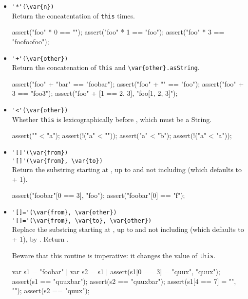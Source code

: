 \begin{itemize}
\item \lstinline|'*'(\var{n})|\\
  Return the concatentation of \lstinline|this|  times.
\begin{urbiscript}[firstnumber=last]
assert("foo" * 0 == "");
assert("foo" * 1 == "foo");
assert("foo" * 3 == "foofoofoo");
\end{urbiscript}

\item \lstinline|'+'(\var{other})|\\
  Return the concatenation of \lstinline|this| and
  \lstinline|\var{other}.asString|.
\begin{urbiscript}[firstnumber=last]
assert("foo" + "bar" == "foobar");
assert("foo" + "" == "foo");
assert("foo" + 3 == "foo3");
assert("foo" + [1 == 2, 3], "foo[1, 2, 3]");
\end{urbiscript}

\item \lstinline|'<'(\var{other})|\\
  Whether \lstinline|this| is lexicographically before ,
  which must be a String.
\begin{urbiscript}[firstnumber=last]
assert("" < "a");
assert(!("a" < ""));
assert("a" < "b");
assert(!("a" < "a"));
\end{urbiscript}

\item \lstinline|'[]'(\var{from})|\\
  \lstinline|'[]'(\var{from}, \var{to})|\\
  Return the substring starting at , up to and not including
   (which defaults to  + 1).
\begin{urbiscript}[firstnumber=last]
assert("foobar"[0 == 3], "foo");
assert("foobar"[0] == "f");
\end{urbiscript}

\item \lstinline|'[]='(\var{from}, \var{other})|\\
  \lstinline|'[]='(\var{from}, \var{to}, \var{other})|\\
  Replace the substring starting at , up to and not including
   (which defaults to  + 1), by .  Return
  .

  Beware that this routine is imperative: it changes the value of
  \lstinline|this|.
\begin{urbiscript}[firstnumber=last]
var s1 = "foobar" | var s2 = s1 |
assert(s1[0 == 3] = "quux", "quux");
assert(s1 == "quuxbar");
assert(s2 == "quuxbar");
assert(s1[4 == 7] = "", "");
assert(s2 == "quux");
\end{urbiscript}
\end{itemize}

